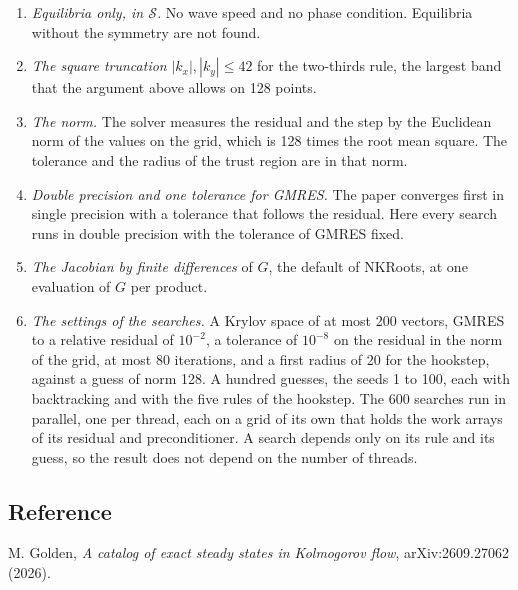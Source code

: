 \documentclass[11pt,a4paper]{article}
\begin{document}
\begin{enumerate}\setlength{\itemsep}{1pt}
\item \emph{Equilibria only, in $\mathcal S$.} No wave speed and no phase condition. Equilibria without the symmetry are not found.
\item \emph{The square truncation} $|k_x|, |k_y| \le 42$ for the two-thirds rule, the largest band that the argument above allows on 128 points.
\item \emph{The norm.} The solver measures the residual and the step by the Euclidean norm of the values on the grid, which is 128 times the root mean square. The tolerance and the radius of the trust region are in that norm.
\item \emph{Double precision and one tolerance for GMRES.} The paper converges first in single precision with a tolerance that follows the residual. Here every search runs in double precision with the tolerance of GMRES fixed.
\item \emph{The Jacobian by finite differences} of $G$, the default of NKRoots, at one evaluation of $G$ per product.
\item \emph{The settings of the searches.} A Krylov space of at most 200 vectors, GMRES to a relative residual of $10^{-2}$, a tolerance of $10^{-8}$ on the residual in the norm of the grid, at most 80 iterations, and a first radius of 20 for the hookstep, against a guess of norm 128. A hundred guesses, the seeds 1 to 100, each with backtracking and with the five rules of the hookstep. The 600 searches run in parallel, one per thread, each on a grid of its own that holds the work arrays of its residual and preconditioner. A search depends only on its rule and its guess, so the result does not depend on the number of threads.
\end{enumerate}

\subsection*{Reference}
M. Golden, \emph{A catalog of exact steady states in Kolmogorov flow}, arXiv:2609.27062 (2026).
\end{document}
